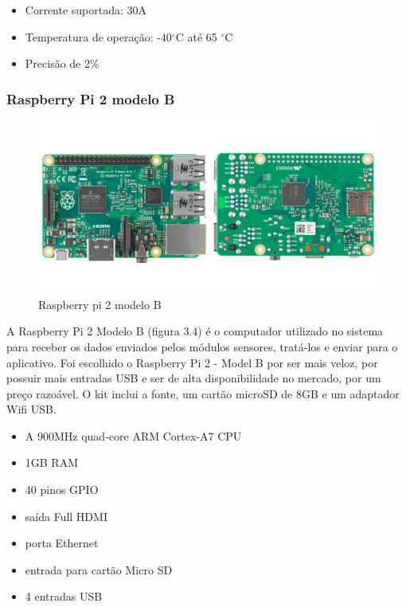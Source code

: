 \begin{itemize}
\item{Corrente suportada: 30A}
\item{Temperatura de operação: -40$^{\circ}$C até 65 $^{\circ}$C}
\item{Precisão de 2\%}
\end{itemize}
%
\subsubsection{Raspberry Pi 2 modelo B}
\begin{figure}[H]
\includegraphics[width=1\textwidth]{figuras/raspberry_pi.png}
\caption{\label{fig:raspberry pi} Raspberry pi 2 modelo B}
\end{figure}

A Raspberry Pi 2 Modelo B (figura 3.4) é o computador utilizado no sistema para receber os dados enviados pelos módulos sensores, tratá-los e enviar para o aplicativo. Foi escolhido o Raspberry Pi 2 - Model B por ser mais veloz, por possuir mais entradas USB e ser de alta disponibilidade no mercado, por um preço razoável. O kit inclui a fonte, um cartão microSD de 8GB e um adaptador Wifi USB.

\begin{itemize}
\item{A 900MHz quad-core ARM Cortex-A7 CPU}
\item{1GB RAM}
\item{40 pinos GPIO}
\item{saída Full HDMI}
\item{porta Ethernet}
\item{entrada para cartão Micro SD}
\item{4 entradas USB}
\end{itemize}
%
